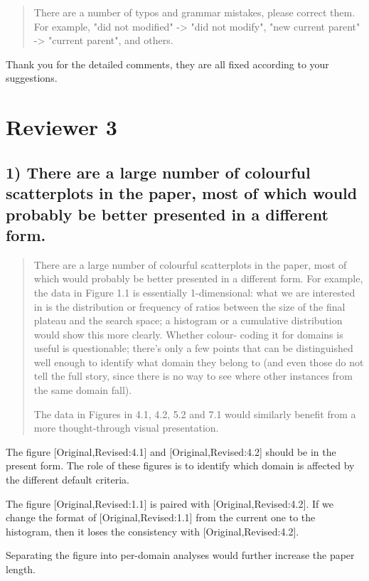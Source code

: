 \documentclass{article}
\begin{document}
\begin{quote}
 There are a number of typos and grammar mistakes, please correct
them. For example, "did not modified" -> "did not modify", "new
current parent" -> "current parent", and others.
\end{quote}

Thank you for the detailed comments, they are all fixed according to your suggestions.
\section{Reviewer 3}
\label{sec:orgheadline34}

\subsection{1) There are a large number of colourful scatterplots in the paper, most of which would probably be better presented in a different form.}
\label{sec:orgheadline26}

\begin{quote}
 There are a large number of colourful scatterplots in the paper, most
of which would probably be better presented in a different form. For
example, the data in Figure 1.1 is essentially 1-dimensional: what we
are interested in is the distribution or frequency of ratios between
the size of the final plateau and the search space; a histogram or a
cumulative distribution would show this more clearly. Whether colour-
coding it for domains is useful is questionable; there's only a few
points that can be distinguished well enough to identify what domain
they belong to (and even those do not tell the full story, since there
is no way to see where other instances from the same domain fall).

The data in Figures in 4.1, 4.2, 5.2 and 7.1 would similarly benefit
from a more thought-through visual presentation.
\end{quote}

The figure [Original,Revised:4.1] and [Original,Revised:4.2] should be in the present form.
The role of these figures is to identify which domain is affected by the different default criteria.

The figure [Original,Revised:1.1] is paired with [Original,Revised:4.2].
If we change the format of [Original,Revised:1.1] from the current one to the histogram,
then it loses the consistency with [Original,Revised:4.2].

Separating the figure into per-domain analyses would further increase the paper length.
\end{document}
